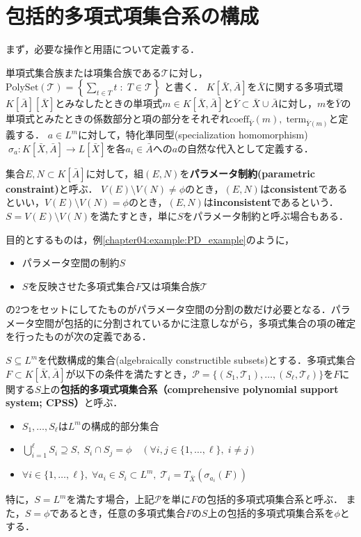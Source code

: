 \section{包括的多項式項集合系の構成}
まず，必要な操作と用語について定義する．
\par
単項式集合族または項集合族である$\mathscr{T}$に対し，$\displaystyle \mathrm{PolySet}(\mathscr{T}) = \left\{ \sum_{t \in T} t \; : \; T \in \mathscr{T} \right\}$
と書く．
$K[\bar{X}, \bar{A}]$を$\bar{X}$に関する多項式環$K[\bar{A}][\bar{X}]$とみなしたときの単項式$m \in K[\bar{X}, \bar{A}]$と$\bar{Y} \subset \bar{X} \cup \bar{A}$に対し，$m$を$\bar{Y}$の単項式とみたときの係数部分と項の部分をそれぞれ$\mathrm{coeff}_{\bar{Y}}(m), \; \mathrm{term}_{\bar{Y}(m)}$と定義する．
$a \in L^m$に対して，特化準同型(specialization homomorphism)$\; \sigma_a : K[\bar{X}, \bar{A}] \to L[\bar{X}]$を各$a_i \in \bar{A}$への$a$の自然な代入として定義する．
\begin{definition}
	\label{chapter04:definition:parameter_constraint}
	集合$E, N \subset K[\bar{A}]$に対して，組$(E, N)$を\textbf{パラメータ制約(parametric constraint)}と呼ぶ．
	$V(E) \setminus V(N) \ne \phi$のとき，$(E, N)$は\textbf{consistent}であるといい，$V(E) \setminus V(N) = \phi$のとき，$(E, N)$は\textbf{inconsistent}であるという．
	$S = V(E) \setminus V(N)$を満たすとき，単に$S$をパラメータ制約と呼ぶ場合もある．
\end{definition}
目的とするものは，例\ref{chapter04:example:PD_example}のように，
\begin{itemize}
	\item パラメータ空間の制約$S$
	\item $S$を反映させた多項式集合$F$又は項集合族$\mathscr{T}$
\end{itemize}
の$2$つをセットにしてたものがパラメータ空間の分割の数だけ必要となる．パラメータ空間が包括的に分割されているかに注意しながら，多項式集合の項の確定を行ったものが次の定義である．
\begin{definition}
	\label{chapter04:definition:CPSS}
	$S \subseteq L^m$を代数構成的集合(algebraically constructible subsets)とする．多項式集合$F \subset K[\bar{X}, \bar{A}]$が以下の条件を満たすとき，$\mathcal{P} = \{ (S_1, \mathscr{T}_1), \dots , (S_\ell, \mathscr{T}_\ell)  \}$を$F$に関する$S$上の\textbf{包括的多項式項集合系（comprehensive polynomial support system; CPSS）}と呼ぶ．
	\begin{itemize}
		\item $S_1, \dots, S_\ell$は$L^m$の構成的部分集合
		\item $\displaystyle \bigcup_{i=1}^\ell S_i\supseteq S, \; S_i \cap S_j = \phi \quad (\forall i,j \in \{ 1, \dots, \ell \}, \; i \ne j)$
		\item $\forall i \in \{1, \dots, \ell \}, \; \forall a_i \in S_i \subset L^m, \; \mathscr{T}_i = T_{\bar{X}}(\sigma_{a_i}(F))$
	\end{itemize}
	特に，$S=L^m$を満たす場合，上記$\mathcal{P}$を単に$F$の包括的多項式項集合系と呼ぶ．
	また，$S=\phi$であるとき，任意の多項式集合$F$の$S$上の包括的多項式項集合系を$\phi$とする．
\end{definition}

